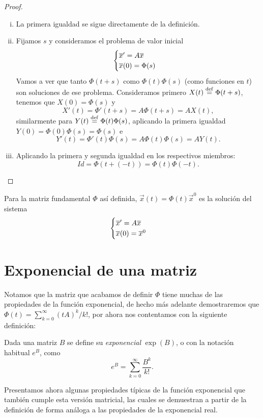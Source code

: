 \documentclass[../ecuaciones_diferenciales.tex]{subfiles}
\begin{document}
\begin{proof}
	\begin{enumerate}[i), wide, labelwidth=0pt, labelindent=0pt]
		\item La primera igualdad se sigue directamente de la definición.

		\item Fijamos \(s\) y consideramos el problema de valor inicial
			\[\begin{cases}\overline{x}' = A\overline{x} \\ \overline{x}(0) = \Phi(s) \end{cases}\]
		      Vamos a ver que tanto \(\Phi(t + s)\) como \(\Phi(t)\Phi(s)\) (como
		      funciones en \(t\)) son soluciones de ese problema. Consideramos
		      primero \(X(t) \overset{\operatorname{def}}{=} \Phi(t + s)\), tenemos que \(X(0) = \Phi(s)\) y
		      \[X'(t) = \Phi'(t + s) = A \Phi(t + s) = A X(t),\]
		      similarmente para \(Y(t) \overset{\operatorname{def}}{=} \Phi(t)\Phi(s)\), aplicando la primera
		      igualdad \(Y(0) = \Phi(0)\Phi(s) = \Phi(s)\) e
		      \[Y'(t) = \Phi'(t)\Phi(s) = A \Phi(t)\Phi(s) = A Y(t).\]

		\item Aplicando la primera y segunda igualdad en los respectivos
		      miembros:
		      \[\mathit{Id} = \Phi(t + (-t)) = \Phi(t)\Phi(-t).\]
	\end{enumerate}
\end{proof}

Para la matriz fundamental \(\Phi\) así definida, 
\(\vec{x}(t) = \Phi(t)\vec{x}^0\) es la solución del sistema
\[\begin{cases}\overline{x}' = A\overline{x} \\ \overline{x}(0) = \overline{x}^0\end{cases}\]

\section{Exponencial de una matriz}

Notamos que la matriz que acabamos de definir \(\Phi\) tiene muchas de las
propiedades de la función exponencial, de hecho más adelante demostraremos que
\(\Phi(t) = \sum_{k=0}^\infty (tA)^k/k!\), por ahora nos contentamos con la
siguiente definición:

\begin{definition}
	Dada una matriz \(B\) se define su \emph{exponencial} \(\exp(B)\), o con la
    notación habitual \(e^B\), como
	\[e^B = \sum_{k = 0}^\infty \frac{B^k}{k!}.\]
\end{definition}

Presentamos ahora algunas propiedades típicas de la función exponencial que
también cumple esta versión matricial, las cuales se demuestran a partir de la
definición de forma análoga a las propiedades de la exponencial real.
\end{document}
